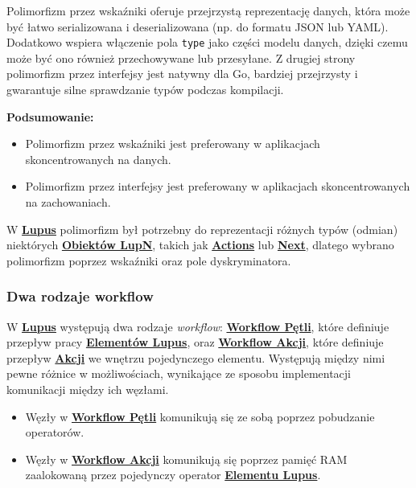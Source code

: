 Polimorfizm przez wskaźniki oferuje przejrzystą reprezentację danych, która może być łatwo serializowana i deserializowana (np. do formatu JSON lub YAML). Dodatkowo wspiera włączenie pola \texttt{type} jako części modelu danych, dzięki czemu może być ono również przechowywane lub przesyłane. Z drugiej strony polimorfizm przez interfejsy jest natywny dla Go, bardziej przejrzysty i gwarantuje silne sprawdzanie typów podczas kompilacji.

\textbf{Podsumowanie:}

\begin{itemize}
    \item Polimorfizm przez wskaźniki jest preferowany w aplikacjach skoncentrowanych na danych.
    \item Polimorfizm przez interfejsy jest preferowany w aplikacjach skoncentrowanych na zachowaniach.
\end{itemize}

W \hyperlink{def:lupus}{\textbf{Lupus}} polimorfizm był potrzebny do reprezentacji różnych typów (odmian) niektórych \hyperlink{def:element}{\textbf{Obiektów LupN}}, takich jak \hyperlink{def:akcja}{\textbf{Actions}} lub \hyperlink{def:next}{\textbf{Next}}, dlatego wybrano polimorfizm poprzez wskaźniki oraz pole dyskryminatora.

\subsubsection{Dwa rodzaje workflow}\label{sec:dwa-rodzaje-workflow}

W \hyperlink{def:lupus}{\textbf{Lupus}} występują dwa rodzaje \textit{workflow}: \hyperlink{def:workflow-petli}{\textbf{Workflow Pętli}}, które definiuje przepływ pracy \hyperlink{def:element-lupus}{\textbf{Elementów Lupus}}, oraz \hyperlink{def:workflow-petli}{\textbf{Workflow Akcji}}, które definiuje przepływ \hyperlink{def:akcja}{\textbf{Akcji}} we wnętrzu pojedynczego elementu. Występują między nimi pewne różnice w możliwościach, wynikające ze sposobu implementacji komunikacji między ich węzłami.

\begin{itemize}
    \item Węzły w \hyperlink{def:workflow-petli}{\textbf{Workflow Pętli}} komunikują się ze sobą poprzez pobudzanie operatorów.
    \item Węzły w \hyperlink{def:workflow-petli}{\textbf{Workflow Akcji}} komunikują się poprzez pamięć RAM zaalokowaną przez pojedynczy operator \hyperlink{def:element-lupus}{\textbf{Elementu Lupus}}.
\end{itemize}

